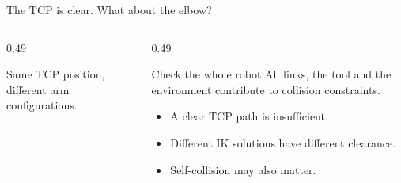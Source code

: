 \documentclass[aspectratio=169]{beamer}
\begin{document}
\begin{frame}[t]{The TCP is clear. What about the elbow?}
    \begin{columns}[T,onlytextwidth]
        \begin{column}{0.49\textwidth}
            \centering
            \par\small Same TCP position, different arm configurations.
        \end{column}
        \begin{column}{0.49\textwidth}
            \begin{block}{Check the whole robot}
                All links, the tool and the environment contribute to collision constraints.
            \end{block}
            \begin{itemize}
                \item A clear TCP path is insufficient.
                \item Different IK solutions have different clearance.
                \item Self-collision may also matter.
            \end{itemize}
        \end{column}
    \end{columns}
\end{frame}
\end{document}
